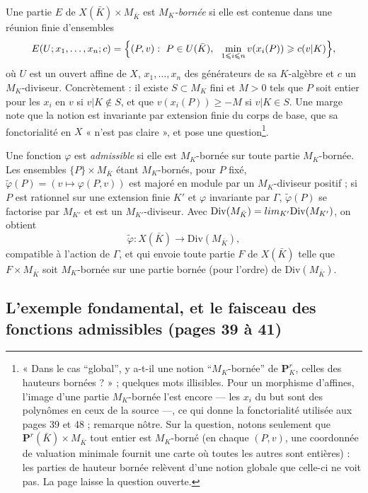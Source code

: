 \documentclass[11pt,a4paper]{article}
\begin{document}
Une partie $E$ de $X(\bar K) \times M_{\bar K}$ est \emph{$M_K$-bornée} si
elle est contenue dans une réunion finie d'ensembles
\[
  E(U; x_1, \ldots, x_n; c) = \Bigl\{(P, v) :\ P \in U(\bar K),\ \
  \min_{1 \leqslant i \leqslant n} v(x_i(P)) \geqslant c(v|K)\Bigr\},
\]
où $U$ est un ouvert affine de $X$, $x_1, \ldots, x_n$ des générateurs de
sa $K$-algèbre et $c$ un $M_K$-diviseur. Concrètement : il existe $S \subset
M_K$ fini et $M > 0$ tels que $P$ soit entier pour les $x_i$ en $v$ si
$v|K \notin S$, et que $v(x_i(P)) \geqslant -M$ si $v|K \in S$. Une marge
note que la notion est invariante par extension finie du corps de base,
que sa fonctorialité en $X$ « n'est pas claire », et pose une
question\footnote{« Dans le cas “global”, y a-t-il une notion “$M_K$-bornée”
de $\mathbf{P}^r_K$, celles des hauteurs bornées ? » ; quelques mots
illisibles. Pour un morphisme d'affines, l'image d'une partie $M_K$-bornée
l'est encore — les $x_i$ du but sont des polynômes en ceux de la source —,
ce qui donne la fonctorialité utilisée aux pages 39 et 48 ; remarque
nôtre. Sur la question, notons seulement que $\mathbf{P}^r(\bar K) \times
M_{\bar K}$ tout entier est $M_K$-borné (en chaque $(P, v)$, une
coordonnée de valuation minimale fournit une carte où toutes les autres
sont entières) : les parties de hauteur bornée relèvent d'une notion
globale que celle-ci ne voit pas. La page laisse la question ouverte.}.

Une fonction $\varphi$ est \emph{admissible} si elle est $M_K$-bornée sur
toute partie $M_K$-bornée. Les ensembles $\{P\} \times M_{\bar K}$ étant
$M_K$-bornés, pour $P$ fixé, $\tilde\varphi(P) = (v \mapsto \varphi(P,v))$
est majoré en module par un $M_K$-diviseur positif ; si $P$ est rationnel
sur une extension finie $K'$ et $\varphi$ invariante par $\Gamma$,
$\tilde\varphi(P)$ se factorise par $M_{K'}$ et est un $M_{K'}$-diviseur.
Avec $\mathrm{Div}(M_{\bar K}) = \varinjlim_{K'} \mathrm{Div}(M_{K'})$, on
obtient
\[
  \tilde\varphi : X(\bar K) \longrightarrow \mathrm{Div}(M_{\bar K}),
\]
compatible à l'action de $\Gamma$, et qui envoie toute partie $F$ de
$X(\bar K)$ telle que $F \times M_{\bar K}$ soit $M_K$-bornée sur une
partie bornée (pour l'ordre) de $\mathrm{Div}(M_{\bar K})$.

\subsection*{L'exemple fondamental, et le faisceau des fonctions admissibles (pages 39 à 41)}
\end{document}

